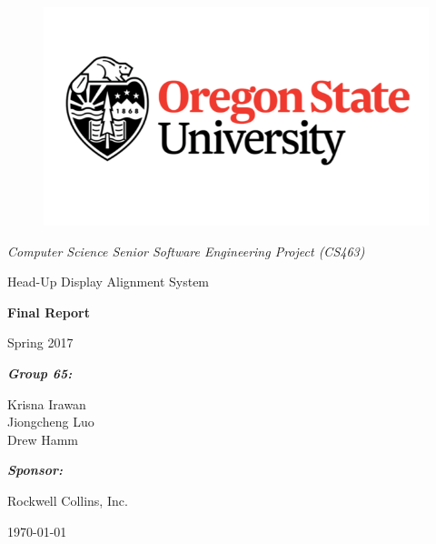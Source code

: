 \documentclass[letterpaper,10pt,onecolumn]{IEEEtran}
\def\title{Computer Science Senior Software Engineering Project (CS463)}
\def\name{Krisna Irawan\\ Jiongcheng Luo\\ Drew Hamm}
\def\doc{Final Report}
\def\term{Spring 2017}
\def\project{Head-Up Display Alignment System}
\begin{document}
\begin{titlepage}
\centering
	\begin{figure}
      	\includegraphics[scale=0.25]{osu_logo}
	\end{figure}
	{\Large\itshape \title\par}
	\vspace{1.5cm}
	\scshape{
		{\Huge \project\par}

		\vspace{1.5cm}
		{\Huge\bfseries\doc\par}
		{\huge \term\par}
	}
	\vspace{2cm}
	{\large\itshape\bfseries Group 65:\par}
	{\large \name\par}
	\vspace{2cm}
	{\large\itshape\bfseries Sponsor:\par}
	{\large Rockwell Collins, Inc.\par}
	\vspace{2cm}
	{\large \today\par}
	\vspace{2cm}

	\begin{abstract}
		This document reports the progress that we have made since the beginning of spring term of 2017. This report mainly introduces our current progress and remaining works of the project, problems that we encoutered and their solutions. This report will also cover the highlighted codes of the software as well as a prelimary result of this project.
	\end{abstract}
	\vfill

\end{titlepage}
\tableofcontents
\end{document}
